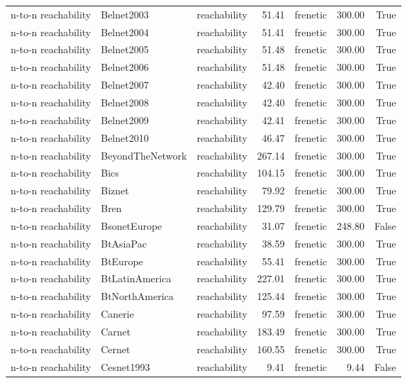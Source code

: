 \begin{tabular}{lllrlrr}
n-to-n reachability & Belnet2003 & reachability & 51.41 & frenetic & 300.00 & True \\
n-to-n reachability & Belnet2004 & reachability & 51.41 & frenetic & 300.00 & True \\
n-to-n reachability & Belnet2005 & reachability & 51.48 & frenetic & 300.00 & True \\
n-to-n reachability & Belnet2006 & reachability & 51.48 & frenetic & 300.00 & True \\
n-to-n reachability & Belnet2007 & reachability & 42.40 & frenetic & 300.00 & True \\
n-to-n reachability & Belnet2008 & reachability & 42.40 & frenetic & 300.00 & True \\
n-to-n reachability & Belnet2009 & reachability & 42.41 & frenetic & 300.00 & True \\
n-to-n reachability & Belnet2010 & reachability & 46.47 & frenetic & 300.00 & True \\
n-to-n reachability & BeyondTheNetwork & reachability & 267.14 & frenetic & 300.00 & True \\
n-to-n reachability & Bics & reachability & 104.15 & frenetic & 300.00 & True \\
n-to-n reachability & Biznet & reachability & 79.92 & frenetic & 300.00 & True \\
n-to-n reachability & Bren & reachability & 129.79 & frenetic & 300.00 & True \\
n-to-n reachability & BsonetEurope & reachability & 31.07 & frenetic & 248.80 & False \\
n-to-n reachability & BtAsiaPac & reachability & 38.59 & frenetic & 300.00 & True \\
n-to-n reachability & BtEurope & reachability & 55.41 & frenetic & 300.00 & True \\
n-to-n reachability & BtLatinAmerica & reachability & 227.01 & frenetic & 300.00 & True \\
n-to-n reachability & BtNorthAmerica & reachability & 125.44 & frenetic & 300.00 & True \\
n-to-n reachability & Canerie & reachability & 97.59 & frenetic & 300.00 & True \\
n-to-n reachability & Carnet & reachability & 183.49 & frenetic & 300.00 & True \\
n-to-n reachability & Cernet & reachability & 160.55 & frenetic & 300.00 & True \\
n-to-n reachability & Cesnet1993 & reachability & 9.41 & frenetic & 9.44 & False \\

\end{tabular}
